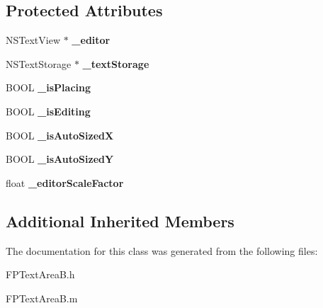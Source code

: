 \subsection*{Protected Attributes}
\begin{DoxyCompactItemize}
\item 
\mbox{\label{interface_f_p_text_area_b_a696a8beed637901c16c714445b394016}} 
N\+S\+Text\+View $\ast$ {\bfseries \+\_\+editor}
\item 
\mbox{\label{interface_f_p_text_area_b_a3f8133f6c104be06c47e48826ce9e1fa}} 
N\+S\+Text\+Storage $\ast$ {\bfseries \+\_\+text\+Storage}
\item 
\mbox{\label{interface_f_p_text_area_b_a6367d271041cc7deebfa89845d11eea4}} 
B\+O\+OL {\bfseries \+\_\+is\+Placing}
\item 
\mbox{\label{interface_f_p_text_area_b_a65ca63b41edd5d8576ead93f3d6cb116}} 
B\+O\+OL {\bfseries \+\_\+is\+Editing}
\item 
\mbox{\label{interface_f_p_text_area_b_a046bce395c2a989a50b2a122df97433e}} 
B\+O\+OL {\bfseries \+\_\+is\+Auto\+SizedX}
\item 
\mbox{\label{interface_f_p_text_area_b_a8a90a953b93c8a72a04dece3c00ef9ed}} 
B\+O\+OL {\bfseries \+\_\+is\+Auto\+SizedY}
\item 
\mbox{\label{interface_f_p_text_area_b_af21896afabddeb5ff5bf721c7cf1257c}} 
float {\bfseries \+\_\+editor\+Scale\+Factor}
\end{DoxyCompactItemize}
\subsection*{Additional Inherited Members}


The documentation for this class was generated from the following files\+:\begin{DoxyCompactItemize}
\item 
F\+P\+Text\+Area\+B.\+h\item 
F\+P\+Text\+Area\+B.\+m\end{DoxyCompactItemize}
